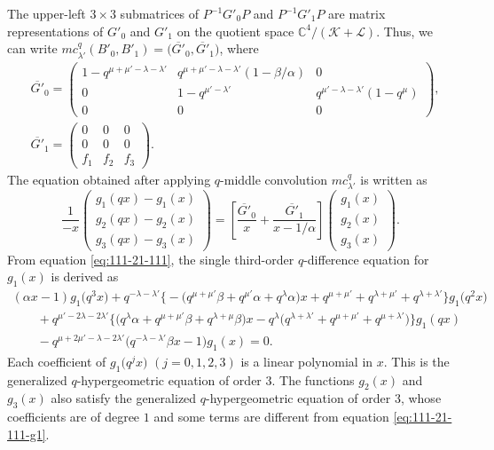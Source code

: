 \documentclass[pdftex]{sigma}
\numberwithin{equation}{section}
\theoremstyle{definition}
\begin{document}
The upper-left $3\times 3$ submatrices of $P^{-1}G'_0 P$ and $P^{-1}G'_1 P$ are matrix representations of $G'_0$ and $G'_1$ on the quotient space $\mathbb{C}^4/(\mathcal{K} + \mathcal{L}) $.
Thus, we can write $mc^q_{\lambda'}(B'_0, B'_1) = \bigl(\overline{G'}_0, \overline{G'}_1\bigr)$, where
\begin{align*}
&\overline{G'}_0
= \begin{pmatrix}
 1-q^{\mu+\mu'-\lambda-\lambda'} & q^{\mu+\mu'-\lambda-\lambda'}(1 - \beta/\alpha) & 0 \\
 0 & 1-q^{\mu'-\lambda'} & q^{\mu'-\lambda-\lambda'} (1 - q^{\mu }) \\
 0 & 0 & 0
 \end{pmatrix}, \\
&\overline{G'}_1
= \begin{pmatrix}
 0 & 0 & 0 \\
 0 & 0 & 0 \\
 f_1 & f_2 & f_3
 \end{pmatrix}.
\end{align*}
The equation obtained after applying $q$-middle convolution $mc^q_{\lambda'}$ is written as
\begin{equation} \label{eq:111-21-111}
\frac{1}{-x}
\begin{pmatrix}
 g_1(qx) - g_1(x) \\
 g_2(qx) - g_2(x) \\
 g_3(qx) - g_3(x)
\end{pmatrix}
= \left[ \frac{\overline{G'}_0}{x} + \frac{\overline{G'}_1}{x-1/\alpha} \right]
 \begin{pmatrix}
 g_1(x) \\
 g_2(x) \\
 g_3(x)
 \end{pmatrix}.
\end{equation}
From equation \eqref{eq:111-21-111}, the single third-order $q$-difference equation for $g_1(x)$ is derived as
\begin{gather}
(\alpha x-1) g_1\bigl(q^3 x\bigr) + q^{-\lambda-\lambda'}
\bigl\{ -\bigl(q^{\mu+\mu'}\beta + q^{\mu'}\alpha + q^{\lambda}\alpha\bigr)x + q^{\mu+\mu'} + q^{\lambda+\mu'} + q^{\lambda+\lambda'} \bigr\} g_1\bigl(q^2 x\bigr) \nonumber \\
\qquad {}+q^{\mu'-2\lambda-2\lambda'}
\bigl\{\bigl(q^{\lambda}\alpha + q^{\mu+\mu'}\beta + q^{\lambda+\mu}\beta\bigr)x -q^{\lambda}\bigl(q^{\lambda+\lambda'} + q^{\mu+\mu'} + q^{\mu+\lambda'}\bigr) \bigr\} g_1(qx) \nonumber \\
\qquad {}-q^{\mu+2\mu'-\lambda-2\lambda'}\bigl(q^{-\lambda-\lambda'}\beta x - 1\bigr)g_1(x)
=0. \label{eq:111-21-111-g1}
\end{gather}
Each coefficient of $g_1 \bigl(q^j x\bigr)$ $(j=0,1,2,3)$ is a linear polynomial in $x$.
This is the generalized $q$-hypergeometric equation of order $3$.
The functions $g_2(x)$ and $g_3(x)$ also satisfy the generalized $q$-hypergeometric equation of order $3$, whose coefficients are of degree $1$ and some terms are different from equation \eqref{eq:111-21-111-g1}.
\end{document}
